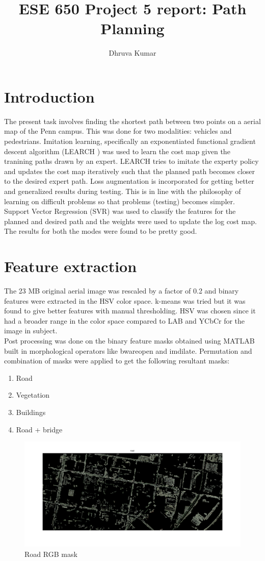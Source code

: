 \documentclass[english]{article}
\title{ESE 650 Project 5 report: Path Planning}
\author{Dhruva Kumar}
\date{}
\begin{document}
\maketitle

\section{Introduction}
The present task involves finding the shortest path between two points on a aerial map of the Penn campus. This was done for two modalities: vehicles and pedestrians. Imitation learning, specifically an exponentiated functional gradient descent algorithm (LEARCH \cite{c1}) was used to learn the cost map given the tranining paths drawn by an expert. LEARCH tries to imitate the experty policy and updates the cost map iteratively such that the planned path becomes closer to the desired expert path. Loss augmentation is incorporated for getting better and generalized results during testing. This is in line with the philosophy of learning on difficult problems so that problems (testing) becomes simpler. Support Vector Regression (SVR) was used to classify the features for the planned and desired path and the weights were used to update the log cost map. The results for both the modes were found to be pretty good. 

\section{Feature extraction}
The 23 MB original aerial image was rescaled by a factor of 0.2 and binary features were extracted in the HSV color space. k-means was tried but it was found to give better features with manual thresholding. HSV was chosen since it had a broader range in the color space compared to LAB and YCbCr for the image in subject. \\
Post processing was done on the binary feature masks obtained using MATLAB built in morphological operators like bwareopen and imdilate. Permutation and combination of masks were applied to get the following resultant masks:
\begin{enumerate}
\item Road
\item Vegetation
\item Buildings
\item Road + bridge
\end{enumerate}

\begin{figure}[thpb]
\centering
\includegraphics[width=\textwidth]{road}
\caption{Road RGB mask}
\end{figure}
\end{document}
